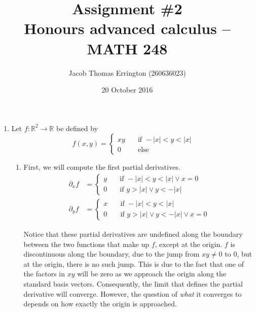 \documentclass[letterpaper,11pt]{article}
\author{Jacob Thomas Errington (260636023)}
\title{Assignment \#2\\Honours advanced calculus -- MATH 248}
\date{20 October 2016}
\newcommand{\R}{\mathbb{R}}
\begin{document}
\maketitle

\begin{enumerate}
    \item
        Let $f : \R^2 \to \R$ be defined by
        \begin{equation*}
            f(x, y) = \begin{cases}
                xy &\quad\text{if } -|x| < y < |x| \\
                0  &\quad\text{else}
            \end{cases}
        \end{equation*}

        \begin{enumerate}
            \item
                First, we will compute the first partial derivatives.
                \begin{align*}
                    \partial_x f &= \begin{cases}
                        y &\quad\text{if }
                            -|x| < y < |x| \lor x = 0\\
                        0 &\quad\text{if }
                            y > |x| \lor y < -|x|
                    \end{cases} \\
                    \partial_y f &= \begin{cases}
                        x &\quad\text{if }
                            -|x| < y < |x| \\
                        0 &\quad\text{if }
                            y > |x| \lor y < -|x| \lor x = 0
                    \end{cases}
                \end{align*}

                Notice that these partial derivatives are undefined along the
                boundary between the two functions that make up $f$, except at
                the origin. $f$ is discontinuous along the boundary, due to the
                jump from $xy \neq 0$ to $0$, but at the origin, there is no
                such jump. This is due to the fact that one of the factors in
                $xy$ will be zero as we approach the origin along the standard
                basis vectors. Consequently, the limit that defines the partial
                derivative will converge. However, the question of \emph{what}
                it converges to depends on how exactly the origin is
                approached.


\end{enumerate}
\end{enumerate}
\end{document}
